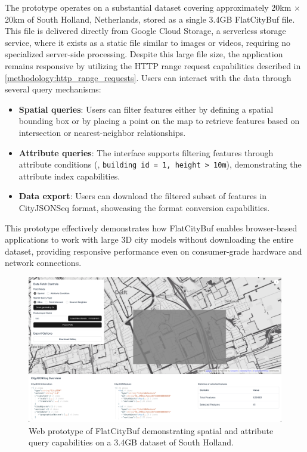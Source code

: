 The prototype operates on a substantial dataset covering approximately 20km $\times$ 20km of South Holland, Netherlands, stored as a single 3.4GB FlatCityBuf file. This file is delivered directly from Google Cloud Storage\citep{gcs}, a serverless storage service, where it exists as a static file similar to images or videos, requiring no specialized server-side processing. Despite this large file size, the application remains responsive by utilizing the HTTP range request capabilities described in \autoref{methodology:http_range_requests}. Users can interact with the data through several query mechanisms:

\begin{itemize}
  \item \textbf{Spatial queries}: Users can filter features either by defining a spatial bounding box or by placing a point on the map to retrieve features based on intersection or nearest-neighbor relationships.

  \item \textbf{Attribute queries}: The interface supports filtering features through attribute conditions (\eg, \texttt{building id = 1, height > 10m}), demonstrating the attribute index capabilities.

  \item \textbf{Data export}: Users can download the filtered subset of features in CityJSONSeq format, showcasing the format conversion capabilities.
\end{itemize}

This prototype effectively demonstrates how FlatCityBuf enables browser-based applications to work with large 3D city models without downloading the entire dataset, providing responsive performance even on consumer-grade hardware and network connections.

\begin{figure}[ht]
  \centering
  \includegraphics[width=1.0\textwidth]{figs/result_analysis/web_prototype.png}
  \caption{Web prototype of FlatCityBuf demonstrating spatial and attribute query capabilities on a 3.4GB dataset of South Holland.}
  \label{fig:result:cross_platform_implementation:web_prototype}
\end{figure}

